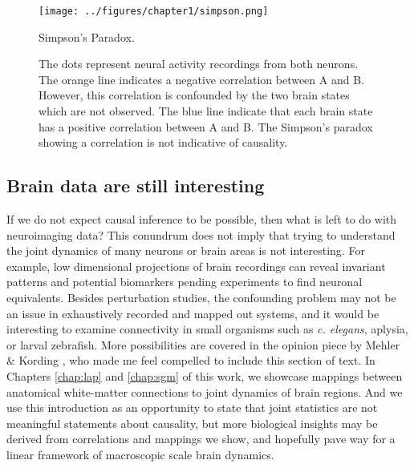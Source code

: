 \begin{figure}[htbp]
	\centering
	\texttt{[image: ../figures/chapter1/simpson.png]}
	\caption{Simpson's Paradox.}
	\caption*{The dots represent neural activity recordings from both neurons. The orange line indicates a negative correlation between A and B. However, this correlation is confounded by the two brain states which are not observed. The blue line indicate that each brain state has a positive correlation between A and B. The Simpson's paradox showing a correlation is not indicative of causality.}
	\label{fig:simpson}
\end{figure}

\subsection{Brain data are still interesting}
If we do not expect causal inference to be possible, then what is left to do with neuroimaging data? This conundrum does not imply that trying to understand the joint dynamics of many neurons or brain areas is not interesting. For example, low dimensional projections of brain recordings can reveal invariant patterns \cite{bruno_spiral_2017,gordon_precision_2017} and potential biomarkers \cite{marceau_biomarker_2018,desowska_dynamics_2019,beijers_data-driven_2019} pending experiments to find neuronal equivalents. Besides perturbation studies, the confounding problem may not be an issue in exhaustively recorded and mapped out systems, and it would be interesting to examine connectivity in small organisms such as \emph{c. elegans}, aplysia, or larval zebrafish. More possibilities are covered in the opinion piece by Mehler \& Kording \cite{mehler_lure_2020}, who made me feel compelled to include this section of text.  In Chapters \ref{chap:lap} and \ref{chap:sgm} of this work, we showcase mappings between anatomical white-matter connections to joint dynamics of brain regions. And we use this introduction as an opportunity to state that joint statistics are not meaningful statements about causality, but more biological insights may be derived from correlations and mappings we show, and hopefully pave way for a linear framework of macroscopic scale brain dynamics.

